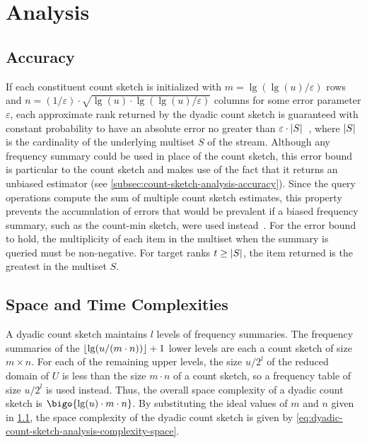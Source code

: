 \section{Analysis}
\label{sec:dyadic-count-sketch-analysis}

\subsection{Accuracy}
\label{subsec:dyadic-count-sketch-analysis-accuracy}

If each constituent count sketch is initialized with \( m = \lg (\lg (u) / \varepsilon) \) rows and \( n = (1 / \varepsilon) \cdot \sqrt{\lg (u) \cdot \lg (\lg (u) / \varepsilon)} \) columns for some error parameter \( \varepsilon \), each approximate rank returned by the dyadic count sketch is guaranteed with constant probability to have an absolute error no greater than \( \varepsilon \cdot \lvert S\rvert \)~\citep{cormode20}, where \( \lvert S\rvert \) is the cardinality of the underlying multiset \( S \) of the stream.
Although any frequency summary could be used in place of the count sketch, this error bound is particular to the count sketch and makes use of the fact that it returns an unbiased estimator (see \cref{subsec:count-sketch-analysis-accuracy}).
Since the query operations compute the sum of multiple count sketch estimates, this property prevents the accumulation of errors that would be prevalent if a biased frequency summary, such as the count-min sketch, were used instead~\citep{cormode20}.
For the error bound to hold, the multiplicity of each item in the multiset when the summary is queried must be non-negative.
For target ranks \( t \geq \lvert S\rvert \), the item returned is the greatest in the multiset \( S \).

\subsection{Space and Time Complexities}
\label{subsec:dyadic-count-sketch-analysis-complexity}

A dyadic count sketch maintains \( l \) levels of frequency summaries.
The frequency summaries of the \( \lfloor\lg (u / (m \cdot n))\rfloor + 1 \) lower levels are each a count sketch of size \( m \times n \).
For each of the remaining upper levels, the size \( u / 2^{l} \) of the reduced domain of \( U \) is less than the size \( m \cdot n \) of a count sketch, so a frequency table of size \( u /2^{l} \) is used instead.
Thus, the overall space complexity of a dyadic count sketch is \( \bigo{\lg (u) \cdot m \cdot n} \).
By substituting the ideal values of \( m \) and \( n \) given in \cref{subsec:dyadic-count-sketch-analysis-accuracy}, the space complexity of the dyadic count sketch is given by \cref{eq:dyadic-count-sketch-analysis-complexity-space}.

